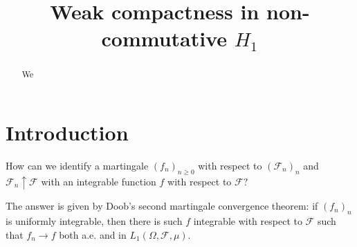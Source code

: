 \documentclass[reqno]{amsart}
\numberwithin{equation}{section}
\begin{document}
\title[Weak compactness in $H_1$]{Weak compactness in non-commutative $H_1$}




%
%
%


\begin{abstract}
We 
\end{abstract}







\section{Introduction}

{\color{blue} 
How can we identify a martingale $(f_n)_{n\ge0}$ with respect to $(\mathcal{F}_n)_n$ and $\mathcal{F}_n \uparrow \mathcal{F}$ with an integrable function $f$ with respect to $\mathcal{F}?$

The answer is given by Doob's second martingale convergence theorem: if $(f_n)_n$ is uniformly integrable, then there is such $f$ integrable with respect to $\mathcal{F}$ such that $f_n \to f$ both a.e. and in $L_1(\Omega, \mathcal{F}, \mu).$
}
\end{document}
